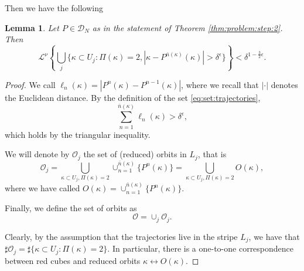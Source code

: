 \documentclass[12 pt]{article}
\theoremstyle{definition} \newtheorem{definition}{Definition}[section]
\theoremstyle{definition} \newtheorem{remark}[definition]{Remark}
\theoremstyle{plain} \newtheorem{lemma}[definition]{Lemma}
\theoremstyle{plain} \newtheorem{proposition}[definition]{Proposition}
\theoremstyle{plain} \newtheorem{theorem}[definition]{Theorem}
\theoremstyle{plain} \newtheorem{corollary}[definition]{Corollary}
\theoremstyle{definition} \newtheorem{example}[definition]{Example}
\theoremstyle{definition} \newtheorem{assumption}[definition]{Assumption}
\theoremstyle{definition} \newtheorem{conjecture}[definition]{Conjecture}
\newcommand{\1}{\mathbbm 1}
\numberwithin{equation}{section}
\begin{document}
Then we have the following
\begin{lemma}\label{lem:cost:trajectories}
    Let $P\in\mathcal{D}_N$ as in the statement of Theorem \ref{thm:problem:step:2}. Then
    \begin{equation}\label{eq:set:trajectories}
        \mathcal{L}^\nu\left\lbrace\bigcup_j\lbrace\kappa\subset U_j: \Pi(\kappa)=2, |\kappa-P^{\bar n(\kappa)}(\kappa)|>\delta^{\epsilon}\rbrace\right\rbrace<\delta^{1-\frac{3}{2}\epsilon}.
    \end{equation}
\end{lemma}
\begin{proof}
     We call $\ell_n(\kappa)=|P^n(\kappa)-P^{n-1}(\kappa)|$, where we recall that $|\cdot |$ denotes the Euclidean distance. By the definition of the set \eqref{eq:set:trajectories}, 
       \begin{equation*}
       \sum_{n=1}^{\bar n(\kappa)}\ell_n(\kappa)>\delta^{\epsilon},
       \end{equation*}
       which holds by the triangular inequality. 
       
       
       
       We will denote by $\mathcal{O}_j$ the set of (reduced) orbits in $L_j$, that is
       \begin{equation*}\mathcal{O}_j=\underset{\kappa\subset U_j,\Pi(\kappa)=2 }{\bigcup}\cup_{n=1}^{\bar n(\kappa)}\lbrace P^n(\kappa)\rbrace=\underset{\kappa\subset U_j,\Pi(\kappa)=2 }{\bigcup} O(\kappa),
       \end{equation*}
where we have called  $O(\kappa)=\cup_{n=1}^{\bar n(\kappa)}\lbrace P^n(\kappa)\rbrace$. 

\medskip 

Finally, we define the set of orbits as
\begin{equation*}
    \mathcal{O}=\cup_j \mathcal{O}_j.
\end{equation*} 
 
       Clearly, by the assumption that the trajectories live in the stripe $L_j$, we have that $\sharp \mathcal O_j=\sharp\lbrace\kappa\subset U_j:\Pi(\kappa)=2\rbrace$. In particular, there is a one-to-one correspondence between red cubes and reduced orbits $\kappa \leftrightarrow O(\kappa).$

\medskip
       

\end{proof}
\end{document}
